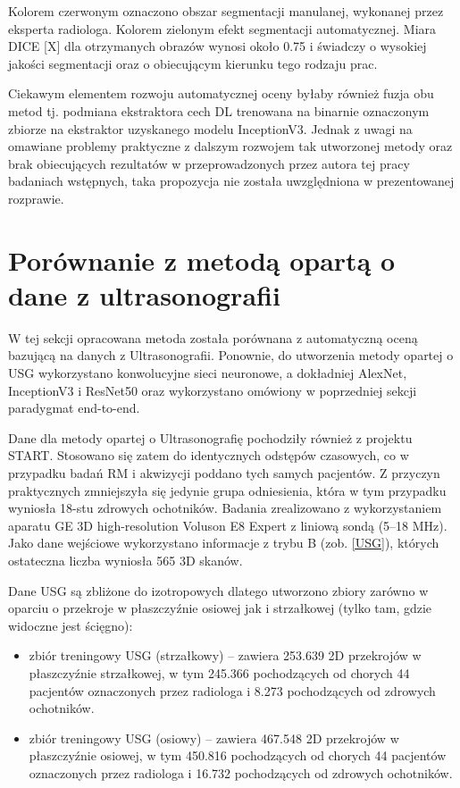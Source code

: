 Kolorem czerwonym oznaczono obszar segmentacji manulanej, wykonanej przez eksperta radiologa. Kolorem zielonym efekt segmentacji automatycznej. Miara DICE [X] dla otrzymanych obrazów wynosi około 0.75 i świadczy o wysokiej jakości segmentacji oraz o obiecującym kierunku tego rodzaju prac.

Ciekawym elementem rozwoju automatycznej oceny byłaby również fuzja obu metod tj. podmiana ekstraktora cech DL trenowana na binarnie oznaczonym zbiorze na ekstraktor uzyskanego modelu InceptionV3. Jednak z uwagi na omawiane problemy praktyczne z dalszym rozwojem tak utworzonej metody oraz brak obiecujących rezultatów w przeprowadzonych przez autora tej pracy badaniach wstępnych, taka propozycja nie została uwzględniona w prezentowanej rozprawie. 

\section{Porównanie z metodą opartą o dane z ultrasonografii}

W tej sekcji opracowana metoda została porównana z automatyczną oceną bazującą na danych z Ultrasonografii. Ponownie, do utworzenia metody opartej o USG wykorzystano konwolucyjne sieci neuronowe, a dokładniej AlexNet, InceptionV3 i ResNet50 oraz wykorzystano omówiony w poprzedniej sekcji paradygmat end-to-end. 

Dane dla metody opartej o Ultrasonografię pochodziły również z projektu START. Stosowano się zatem do identycznych odstępów czasowych, co w przypadku badań RM i akwizycji poddano tych samych pacjentów. Z przyczyn praktycznych zmniejszyła się jedynie grupa odniesienia, która w tym przypadku wyniosła 18-stu zdrowych ochotników. Badania zrealizowano z wykorzystaniem aparatu GE 3D high-resolution Voluson E8 Expert z liniową sondą (5--18 MHz). Jako dane wejściowe wykorzystano informacje z trybu B (zob. \ref{USG}), których ostateczna liczba wyniosła 565 3D skanów. 

Dane USG są zbliżone do izotropowych dlatego utworzono zbiory zarówno w oparciu o przekroje w płaszczyźnie osiowej jak i strzałkowej (tylko tam, gdzie widoczne jest ścięgno):
\begin{itemize}
	\item zbiór treningowy USG (strzałkowy) -- zawiera 253.639 2D przekrojów w płaszczyźnie strzałkowej, w tym 245.366 pochodzących od chorych 44 pacjentów oznaczonych przez radiologa i 8.273 pochodzących od zdrowych ochotników.
	\item zbiór treningowy USG (osiowy) -- zawiera 467.548 2D przekrojów w płaszczyźnie osiowej, w tym 450.816 pochodzących od chorych 44 pacjentów oznaczonych przez radiologa i 16.732 pochodzących od zdrowych ochotników. 
\end{itemize}

